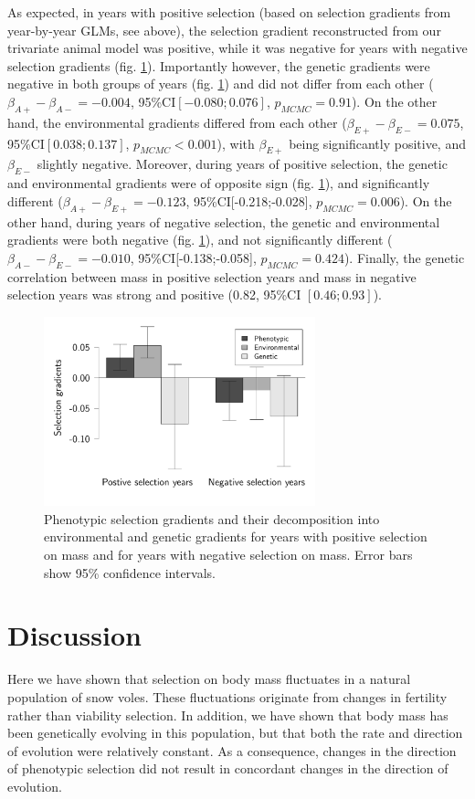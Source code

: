 As expected, in years with positive selection (based on selection gradients from year-by-year GLMs, see above), the selection gradient reconstructed from our trivariate animal model was positive, while it was negative for years with negative selection gradients (fig. \ref{fig:betas}). Importantly however, the genetic gradients were negative in both groups of years (fig. \ref{fig:betas}) and did not differ from each other ($\beta_{A+}-\beta_{A-} = -0.004$, 95\%CI$ [-0.080;0.076]$, $p_{MCMC}=0.91$). On the other hand, the environmental gradients differed from each other ($\beta_{E+}-\beta_{E-} = 0.075$, 95\%CI$ [0.038;0.137]$, $p_{MCMC}<0.001$), with $\beta_{E+}$ being significantly positive, and $\beta_{E-}$ slightly negative.
Moreover, during years of positive selection, the genetic and environmental gradients were of opposite sign (fig. \ref{fig:betas}), and significantly different ($\beta_{A+}-\beta_{E+} = -0.123$, 95\%CI[-0.218;-0.028], $p_{MCMC}=0.006$).
On the other hand, during years of negative selection, the genetic and environmental gradients were both negative (fig. \ref{fig:betas}), and not significantly different ($\beta_{A-}-\beta_{E-} = -0.010$, 95\%CI[-0.138;-0.058], $p_{MCMC}=0.424$). Finally, the genetic correlation between mass in positive selection years and mass in negative selection years was strong and positive (0.82, 95\%CI $[0.46; 0.93]$).

\begin{figure}[ht]
\centering
\includegraphics[width=0.7\textwidth]{FiguresFluSel/Betas-1}
\caption{\footnotesize Phenotypic selection gradients and their decomposition into environmental and genetic gradients for years with positive selection on mass and for years with negative selection on mass. Error bars show 95\% confidence intervals.}
\label{fig:betas}
\end{figure}


\section*{Discussion}
Here we have shown that selection on body mass fluctuates in a natural population of snow voles. These fluctuations originate from changes in fertility rather than viability selection. 
In addition, we have shown that body mass has been genetically evolving in this population, but that both the rate and direction of evolution were relatively constant. As a consequence, changes in the direction of phenotypic selection did not result in concordant changes in the direction of evolution.

